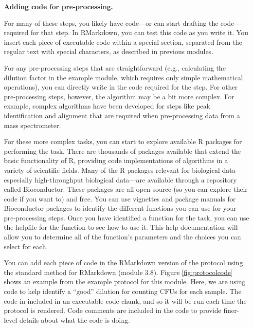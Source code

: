 \documentclass[]{tufte-book}
\begin{document}
\textbf{Adding code for pre-processing.}

For many of these steps, you likely have code---or can start drafting the
code---required for that step.
In RMarkdown, you can test this code as you write it. You insert each piece
of executable code within a special section, separated from the regular
text with special characters, as described in previous modules.

For any pre-processing steps that are straightforward (e.g., calculating the
dilution factor in the example module, which requires only simple mathematical
operations), you can directly write in the code required for the step.
For other pre-processing steps, however, the algorithm may be a bit more
complex. For example, complex algorithms have been developed for steps like
peak identification and alignment that are required when
pre-processing data from a mass spectrometer.

For these more complex tasks, you can start to explore available R packages for
performing the task. There are thousands of packages available that extend the
basic functionality of R, providing code implementations of algorithms in a
variety of scientific fields. Many of the R packages relevant for biological
data---especially high-throughput biological data---are available through a
repository called Bioconductor. These packages are all open-source (so you can
explore their code if you want to) and free. You can use vignettes and package
manuals for Bioconductor packages to identify the different functions you can
use for your pre-processing steps. Once you have identified a function for the
task, you can use the helpfile for the function to see how to use it. This help
documentation will allow you to determine all of the function's parameters and
the choices you can select for each.

You can add each piece of code in the RMarkdown version of the protocol using
the standard method for RMarkdown (module 3.8). Figure \ref{fig:protocolcode}
shows an example from the example protocol for this module. Here, we are using
code to help identify a ``good'' dilution for counting CFUs for each sample. The
code in included in an executable code chunk, and so it will be run each time
the protocol is rendered. Code comments are included in the code to provide
finer-level details about what the code is doing.
\end{document}
